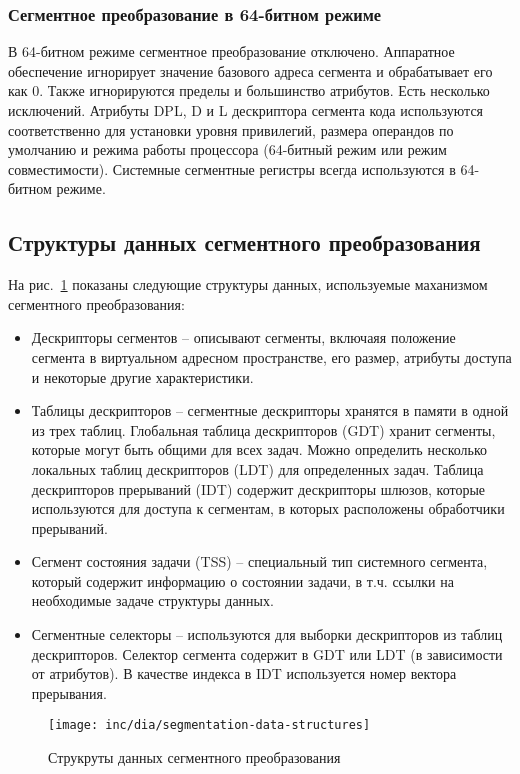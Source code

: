 \subsubsection*{Сегментное преобразование в 64-битном режиме}
В 64-битном режиме сегментное преобразование отключено. Аппаратное обеспечение игнорирует значение
базового адреса сегмента и обрабатывает его как 0. Также игнорируются пределы и большинство атрибутов.
Есть несколько исключений. Атрибуты DPL, D и L дескриптора сегмента кода используются соответственно для установки
уровня привилегий, размера операндов по умолчанию и режима работы процессора (64-битный режим или режим совместимости).
Системные сегментные регистры всегда используются в 64-битном режиме.

\subsection{Структуры данных сегментного преобразования}
На рис.~\ref{fig:segmentation-data-structures} показаны следующие структуры данных, используемые
маханизмом сегментного преобразования:
\begin{itemize}
\item Дескрипторы сегментов -- описывают сегменты, включаяя положение сегмента в виртуальном
	адресном пространстве, его размер, атрибуты доступа и некоторые другие характеристики.
\item Таблицы дескрипторов -- сегментные дескрипторы хранятся в памяти в одной из трех таблиц.
	Глобальная таблица дескрипторов (GDT) хранит сегменты, которые могут быть общими для всех задач.
	Можно определить несколько локальных таблиц дескрипторов (LDT) для определенных задач.
	Таблица дескрипторов прерываний (IDT) содержит дескрипторы шлюзов, которые используются
	для доступа к сегментам, в которых расположены обработчики прерываний.
\item Сегмент состояния задачи (TSS) -- специальный тип системного сегмента, который содержит
	информацию о состоянии задачи, в т.ч. ссылки на необходимые задаче структуры данных.
\item Сегментные селекторы -- используются для выборки дескрипторов из таблиц дескрипторов.
	Селектор сегмента содержит в GDT или LDT (в зависимости от атрибутов). В качестве индекса в
	IDT используется номер вектора прерывания.
\end{itemize}

\begin{figure}
  \centering
  \texttt{[image: inc/dia/segmentation-data-structures]}
  \caption{Струкруты данных сегментного преобразования}
  \label{fig:segmentation-data-structures}
\end{figure}

